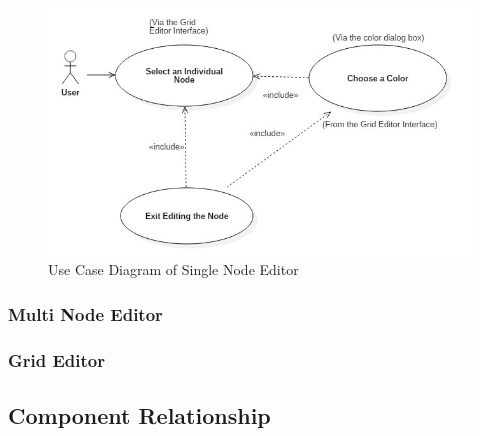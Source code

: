 \documentclass[12pt]{article}
\begin{document}
			\begin{figure}[ht!]
				\centering
				\includegraphics[width=150mm]{SingleNodeEditorDiagram.JPG}
				\caption{Use Case Diagram of Single Node Editor \label{overflow}}
			\end{figure}
		
			\subsubsection {Multi Node Editor}
			\forceindent 
			
			\subsubsection {Grid Editor}
			\forceindent 
			
		
		\subsection {Component Relationship}
		\forceindent 

		
	
\end{document}

